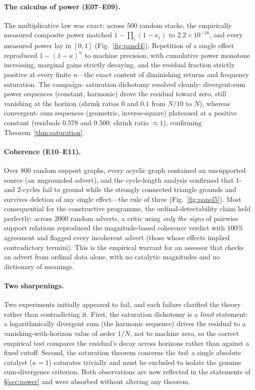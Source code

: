 \documentclass[twocolumn,11pt,a4paper]{article}
\theoremstyle{adv}
\theoremstyle{definition}
\theoremstyle{remark}
\newcommand{\pot}{\kappa}             %
\begin{document}
\paragraph{The calculus of power (E07--E09).}
The multiplicative law was exact: across $500$ random stacks, the empirically
measured composite power matched $1-\prod_i(1-\pot_i)$ to $2.2\times10^{-16}$,
and every measured power lay in $[0,1]$ (Fig.~\ref{fig:panel4}). Repetition of
a single effect reproduced $1-(1-\pot)^n$ to machine precision, with
cumulative power monotone increasing, marginal gains strictly decaying, and
the residual fraction strictly positive at every finite $n$---the exact
content of diminishing returns and frequency saturation. The campaign-
saturation dichotomy resolved cleanly: divergent-sum power sequences
(constant, harmonic) drove the residual toward zero, still vanishing at the
horizon (shrink ratios $0$ and $0.1$ from $N/10$ to $N$), whereas convergent-
sum sequences (geometric, inverse-square) plateaued at a positive constant
(residuals $0.578$ and $0.500$; shrink ratio $\approx1$), confirming
Theorem~\ref{thm:saturation}.

\paragraph{Coherence (E10--E11).}
Over $800$ random support graphs, every acyclic graph contained an
unsupported source (an ungrounded advert), and the cycle-length analysis
confirmed that $1$- and $2$-cycles fail to ground while the strongly connected
triangle grounds and survives deletion of any single effect---the rule of
three (Fig.~\ref{fig:panel5}). Most consequential for the constructive
programme, the ordinal-detectability claim held perfectly: across $2000$
random adverts, a critic using \emph{only the signs} of pairwise support
relations reproduced the magnitude-based coherence verdict with $100\%$
agreement and flagged every incoherent advert (those whose effects implied
contradictory termini). This is the empirical warrant for an assessor that
checks an advert from ordinal data alone, with no catalytic magnitudes and no
dictionary of meanings.

\paragraph{Two sharpenings.}
Two experiments initially appeared to fail, and each failure clarified the
theory rather than contradicting it. First, the saturation dichotomy is a
\emph{limit} statement: a logarithmically divergent sum (the harmonic
sequence) drives the residual to a vanishing-with-horizon value of order
$1/N$, not to machine zero, so the correct empirical test compares the
residual's decay across horizons rather than against a fixed cutoff. Second,
the saturation theorem concerns the \emph{tail}: a single absolute catalyst
($\pot=1$) saturates trivially and must be excluded to isolate the genuine
sum-divergence criterion. Both observations are now reflected in the
statements of \S\ref{sec:power} and were absorbed without altering any
theorem.
\end{document}
